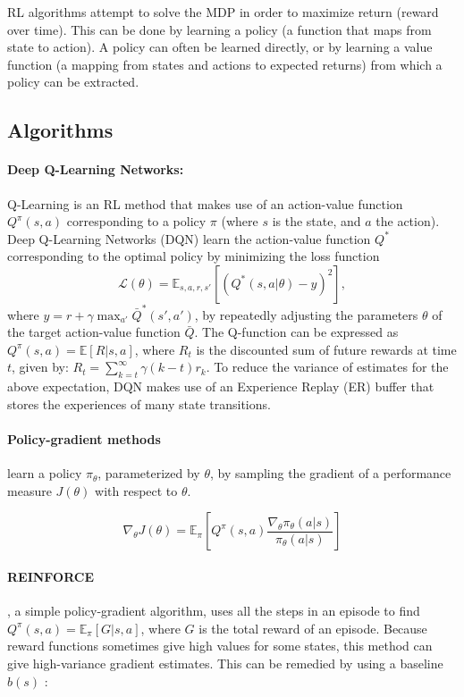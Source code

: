 \documentclass[11pt,a4paper]{article}
\begin{document}
RL algorithms attempt to solve the MDP in order to maximize return (reward over time).
This can be done by learning a policy (a function that maps from state to action).
A policy can often be learned directly, or by learning a value function (a mapping from states and actions to expected returns) from which a policy can be extracted.

\subsection{Algorithms}

\paragraph{Deep Q-Learning Networks:} Q-Learning \citep{watkins} is an RL method that makes use of an action-value function $Q^\pi(s, a)$ corresponding to a policy $\pi$ (where $s$ is the state, and $a$ the action).
Deep Q-Learning Networks (DQN) \citep{2015Natur.518..529M} learn the action-value function $Q^*$ corresponding to the optimal policy by minimizing the loss function
\begin{equation}
  \mathcal{L}(\theta)=\mathbb{E}_{s,a,r,s'}[(Q^*(s,a|\theta)-y)^2],
\end{equation}
where $y=r+\gamma\max_{a'}\bar{Q}^*(s',a')$,
by repeatedly adjusting the parameters $\theta$ of the target action-value function $\bar{Q}$.
The Q-function can be expressed as $Q^{\pi}(s,a)=\mathbb{E}[R|s,a]$, where $R_t$ is the discounted sum of future rewards at time $t$, given by: $R_t=\sum_{k=t}^\infty\gamma(k-t)r_k$.
To reduce the variance of estimates for the above expectation, DQN makes use of an Experience Replay (ER) buffer that stores the experiences of many state transitions.

\paragraph{Policy-gradient methods} learn a policy $\pi_\theta$, parameterized by $\theta$,
by sampling the gradient of a performance measure $J(\theta)$ with respect to $\theta$.

\begin{equation}
  \nabla_\theta J(\theta)=\mathbb{E}_\pi\left[Q^\pi(s, a) \frac{\nabla_\theta\pi_\theta(a|s)}{\pi_\theta(a|s)}\right]
\end{equation}

\paragraph{REINFORCE} \citep{Williams92simplestatistical}, a simple policy-gradient algorithm, uses all the steps in an episode to find $Q^\pi(s,a)=\mathbb{E}_\pi[G|s,a]$, where $G$ is the total reward of an episode.
Because reward functions sometimes give high values for some states, this method can give high-variance gradient estimates.
This can be remedied by using a baseline $b(s)$ \citep{SuttonBarto}:
\end{document}
